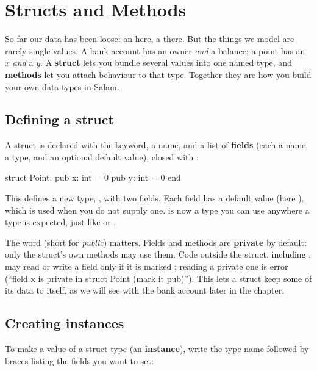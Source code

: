 \chapter{Structs and Methods}%
\label{ch:structs-methods}

So far our data has been loose: an  here, a  there. But the
things we model are rarely single values. A bank account has an owner \emph{and} a
balance; a point has an $x$ \emph{and} a $y$. A \textbf{struct} lets you bundle
several values into one named type, and \textbf{methods} let you attach behaviour
to that type. Together they are how you build your own data types in Salam.

\section{Defining a struct}

A struct is declared with the  keyword, a name, and a list of
\textbf{fields} (each a name, a type, and an optional default value), closed
with :

\begin{salamen}
struct Point:
    pub x: int = 0
    pub y: int = 0
end
\end{salamen}

This defines a new type, , with two fields. Each field has a default
value (here ), which is used when you do not supply one.  is
now a type you can use anywhere a type is expected, just like  or
.

The word  (short for \emph{public}) matters. Fields and methods are
\textbf{private} by default: only the struct's own methods may use them. Code
outside the struct, including , may read or write a field only if it
is marked ; reading a private one is error  (``field \textquotesingle{}x\textquotesingle{} is
private in struct \textquotesingle{}Point\textquotesingle{} (mark it \textquotesingle{}pub\textquotesingle{})''). This lets a struct keep some of its
data to itself, as we will see with the bank account later in the chapter.

\section{Creating instances}

To make a value of a struct type (an \textbf{instance}), write the type name
followed by braces listing the fields you want to set:

